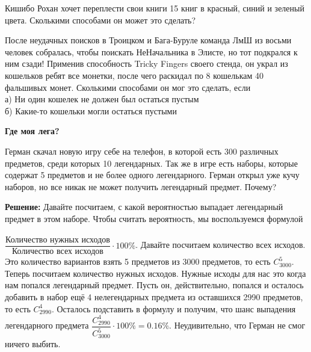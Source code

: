 Кишибо Рохан хочет переплести свои книги 15 книг в красный, синий и зеленый цвета. Сколькими способами он может это сделать?

После неудачных поисков в Троицком и Бага-Буруле команда ЛмШ из восьми человек собралась, чтобы поискать НеНачальника в Элисте, но тот подкрался к ним сзади! Применив способность Tricky Fingers своего стенда, он украл из кошельков ребят все монетки, после чего раскидал по 8 кошелькам 40 фальшивых монет. Сколькими способами он мог это сделать, если\\
а) Ни один кошелек не должен был остаться пустым\\
б) Какие-то кошельки могли остаться пустыми

\textbf{\Large Где моя лега?}

Герман скачал новую игру себе на телефон, в которой есть 300 различных предметов, среди которых 10 легендарных. Так же в игре есть наборы, которые содержат 5 предметов и не более одного легендарного. Герман открыл уже кучу наборов, но все никак не может получить легендарный предмет. Почему?

\textbf{Решение:} Давайте посчитаем, с какой вероятностью выпадает легендарный предмет в этом наборе. Чтобы считать вероятность, мы воспользуемся формулой\\
\\
$\dfrac{\text{Количество нужных исходов}}{\text{Количество всех исходов}}\cdot 100\%$. Давайте посчитаем количество всех исходов. Это количество вариантов взять 5 предметов из 3000 предметов, то есть $C_{3000}^5$. Теперь посчитаем количество нужных исходов. Нужные исходы для нас это когда нам попался легендарный предмет. Пусть он, действительно, попался и осталось добавить в набор ещё 4 нелегендарных предмета из оставшихся 2990 предметов, то есть $C_{2990}^4$. Осталось подставить в формулу и получим, что шанс выпадения легендарного предмета $\dfrac{C_{2990}^4}{C_{3000}^5}\cdot100\% = 0.16\%$. Неудивительно, что Герман не смог ничего выбить.